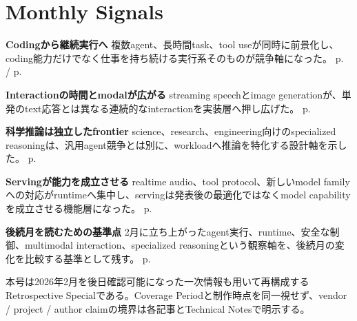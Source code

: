 \section*{Monthly Signals}
\smallskip
\noindent\textbf{Codingから継続実行へ} 複数agent、長時間task、tool useが同時に前景化し、coding能力だけでなく仕事を持ち続ける実行系そのものが競争軸になった。 \hfill{\footnotesize p.~\pageref{pkg:agentic-engineering-frontier} / p.~\pageref{pkg:open-model-agent-stack}}\par
\smallskip
\noindent\textbf{Interactionの時間とmodalが広がる} streaming speechとimage generationが、単発のtext応答とは異なる連続的なinteractionを実装層へ押し広げた。 \hfill{\footnotesize p.~\pageref{pkg:realtime-multimodal-interaction}}\par
\smallskip
\noindent\textbf{科学推論は独立したfrontier} science、research、engineering向けのspecialized reasoningは、汎用agent競争とは別に、workloadへ推論を特化する設計軸を示した。 \hfill{\footnotesize p.~\pageref{pkg:specialized-reasoning-science}}\par
\smallskip
\noindent\textbf{Servingが能力を成立させる} realtime audio、tool protocol、新しいmodel familyへの対応がruntimeへ集中し、servingは発表後の最適化ではなくmodel capabilityを成立させる機能層になった。 \hfill{\footnotesize p.~\pageref{pkg:serving-stack-catches-up}}\par
\smallskip
\noindent\textbf{後続月を読むための基準点} 2月に立ち上がったagent実行、runtime、安全な制御、multimodal interaction、specialized reasoningという観察軸を、後続月の変化を比較する基準として残す。 \hfill{\footnotesize p.~\pageref{pkg:closing-synthesis}}\par
\medskip
\begin{claimboundary}
本号は2026年2月を後日確認可能になった一次情報も用いて再構成するRetrospective Specialである。Coverage Periodと制作時点を同一視せず、vendor / project / author claimの境界は各記事とTechnical Notesで明示する。
\end{claimboundary}
\medskip
\setcounter{tocdepth}{1}
\tableofcontents
